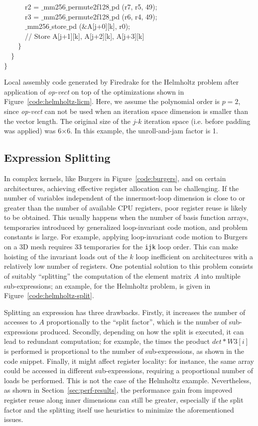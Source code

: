 \documentclass[conference]{IEEEtran}
\begin{document}
\begin{algorithm}[t]
~~~~~~r2 = $\_$mm256$\_$permute2f128$\_$pd (r7, r5, 49);\\
~~~~~~r3 = $\_$mm256$\_$permute2f128$\_$pd (r6, r4, 49);\\
~~~~~~$\_$mm256$\_$store$\_$pd ($\&$A[j+0][k], r0);\\
~~~~~~// Store A[j+1][k], A[j+2][k], A[j+3][k]\\
~~~~$\rbrace$\\
~~$\rbrace$\\
$\rbrace$
\caption{Local assembly code generated by Firedrake for the Helmholtz problem after application of \emph{op-vect} on top of the optimizations shown in Figure~\ref{code:helmholtz-licm}. Here, we assume the polynomial order is $p=2$, since \emph{op-vect} can not be used when an iteration space dimension is smaller than the vector length. The original size of the $j$-$k$ iteration space (i.e. before padding was applied) was 6$\times$6. In this example, the unroll-and-jam factor is 1.}
\label{code:helmholtz-opvect}
\end{algorithm}



\subsection{Expression Splitting}
\label{sec:expr-split}
In complex kernels, like Burgers in Figure~\ref{code:burgers}, and on certain architectures, achieving effective register allocation can be challenging. If the number of variables independent of the innermost-loop dimension is close to or greater than the number of available CPU registers, poor register reuse is likely to be obtained. This usually happens when the number of basis function arrays, temporaries introduced by generalized loop-invariant code motion, and problem constants is large. For example, applying loop-invariant code motion to Burgers on a 3D mesh requires 33 temporaries for the \texttt{ijk} loop order. This can make hoisting of the invariant loads out of the $k$ loop inefficient on architectures with a relatively low number of registers. One potential solution to this problem consists of suitably ``splitting'' the computation of the element matrix $A$ into multiple sub-expressions; an example, for the Helmholtz problem, is given in Figure~\ref{code:helmholtz-split}. 

Splitting an expression has three drawbacks. Firstly, it increases the number of accesses to $A$ proportionally to the ``split factor'', which is the number of sub-expressions produced. Secondly, depending on how the split is executed, it can lead to redundant computation; for example, the times the product $det*W3[i]$ is performed is proportional to the number of sub-expressions, as shown in the code snippet. Finally, it might affect register locality: for instance, the same array could be accessed in different sub-expressions, requiring a proportional number of loads be performed. This is not the case of the Helmholtz example. Nevertheless, as shown in Section~\ref{sec:perf-results}, the performance gain from improved register reuse along inner dimensions can still be greater, especially if the split factor and the splitting itself use heuristics to minimize the aforementioned issues.
\end{document}
